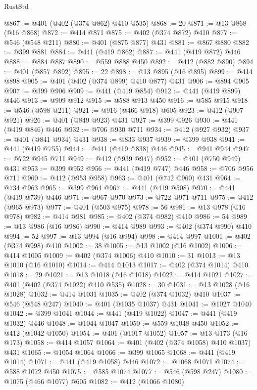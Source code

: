 \begin{lexlean}{RustStd}
\begin{coremodule}
@867 := @401 (@402 (@374 @862) @410 @535)
@868 := 20
@871 := @13 @868 (@16 @868)
@872 := @414 @871
@875 := @402 (@374 @872) @410
@877 := @546 (@548 @211)
@880 := @401 (@875 @877) @431
@881 := @867 @880
@882 := @399 @881
@884 := @441 (@419 @862)
@887 := @441 (@419 @872) @446
@888 := @884 @887
@890 := @559 @888 @450
@892 := @412 (@882 @890)
@894 := @401 (@857 @892)
@895 := 22
@898 := @13 @895 (@16 @895)
@899 := @414 @898
@905 := @401 (@402 (@374 @899) @410 @877) @431
@906 := @894 @905
@907 := @399 @906
@909 := @441 (@419 @854)
@912 := @441 (@419 @899) @446
@913 := @909 @912
@915 := @588 @913 @450
@916 := @585 @915
@918 := @546 (@598 @211)
@921 := @916 (@466 @918) @605
@923 := @412 (@907 @921)
@926 := @401 (@849 @923) @431
@927 := @399 @926
@930 := @441 (@419 @846) @446
@932 := @706 @930 @711
@934 := @412 (@927 @932)
@937 := @401 (@841 @934) @431
@938 := @833 @937
@939 := @399 @938
@941 := @441 (@419 @755)
@944 := @441 (@419 @838) @446
@945 := @941 @944
@947 := @722 @945 @711
@949 := @412 (@939 @947)
@952 := @401 (@750 @949) @431
@953 := @399 @952
@956 := @441 (@419 @747) @446
@958 := @706 @956 @711
@960 := @412 (@953 @958)
@963 := @401 (@742 @960) @431
@964 := @734 @963
@965 := @399 @964
@967 := @441 (@419 @508)
@970 := @441 (@419 @739) @446
@971 := @967 @970
@973 := @722 @971 @711
@975 := @412 (@965 @973)
@977 := @401 (@503 @975)
@978 := 56
@981 := @13 @978 (@16 @978)
@982 := @414 @981
@985 := @402 (@374 @982) @410
@986 := 54
@989 := @13 @986 (@16 @986)
@990 := @414 @989
@993 := @402 (@374 @990) @410
@994 := 52
@997 := @13 @994 (@16 @994)
@998 := @414 @997
@1001 := @402 (@374 @998) @410
@1002 := 38
@1005 := @13 @1002 (@16 @1002)
@1006 := @414 @1005
@1009 := @402 (@374 @1006) @410
@1010 := 31
@1013 := @13 @1010 (@16 @1010)
@1014 := @414 @1013
@1017 := @402 (@374 @1014) @410
@1018 := 29
@1021 := @13 @1018 (@16 @1018)
@1022 := @414 @1021
@1027 := @401 (@402 (@374 @1022) @410 @535)
@1028 := 30
@1031 := @13 @1028 (@16 @1028)
@1032 := @414 @1031
@1035 := @402 (@374 @1032) @410
@1037 := @546 (@548 @247)
@1040 := @401 (@1035 @1037) @431
@1041 := @1027 @1040
@1042 := @399 @1041
@1044 := @441 (@419 @1022)
@1047 := @441 (@419 @1032) @446
@1048 := @1044 @1047
@1050 := @559 @1048 @450
@1052 := @412 (@1042 @1050)
@1054 := @401 (@1017 @1052)
@1057 := @13 @173 (@16 @173)
@1058 := @414 @1057
@1064 := @401 (@402 (@374 @1058) @410 @1037) @431
@1065 := @1054 @1064
@1066 := @399 @1065
@1068 := @441 (@419 @1014)
@1071 := @441 (@419 @1058) @446
@1072 := @1068 @1071
@1074 := @588 @1072 @450
@1075 := @585 @1074
@1077 := @546 (@598 @247)
@1080 := @1075 (@466 @1077) @605
@1082 := @412 (@1066 @1080)

\end{coremodule}
\end{lexlean}
